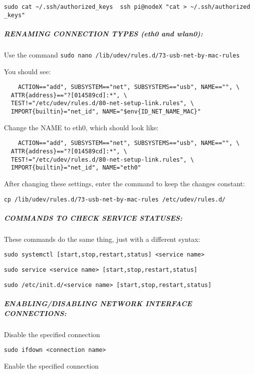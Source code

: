 \documentclass[]{article}
\let\oldsubparagraph\subparagraph
\renewcommand{\subparagraph}[1]{\oldsubparagraph{#1}\mbox{}}
\begin{document}
\texttt{sudo\ cat\ \textasciitilde{}/.ssh/authorized\_keys\ \textbar{}\ ssh\ pi@nodeX\ "cat\ \textgreater{}\ \textasciitilde{}/.ssh/authorized\_keys"}

\subparagraph{RENAMING CONNECTION TYPES (eth0 and
wlan0):}\label{renaming-connection-types-eth0-and-wlan0}

Use the command
\texttt{sudo\ nano\ /lib/udev/rules.d/73-usb-net-by-mac-rules}

You should see:

\begin{verbatim}
    ACTION=="add", SUBSYSTEM=="net", SUBSYSTEMS=="usb", NAME=="", \
  ATTR{address}=="?[014589cd]:*", \
  TEST!="/etc/udev/rules.d/80-net-setup-link.rules", \
  IMPORT{builtin}="net_id", NAME="$env{ID_NET_NAME_MAC}"
\end{verbatim}

Change the NAME to eth0, which should look like:

\begin{verbatim}
    ACTION=="add", SUBSYSTEM=="net", SUBSYSTEMS=="usb", NAME=="", \
  ATTR{address}=="?[014589cd]:*", \
  TEST!="/etc/udev/rules.d/80-net-setup-link.rules", \
  IMPORT{builtin}="net_id", NAME="eth0"
\end{verbatim}

After changing these settings, enter the command to keep the changes
constant:

\texttt{cp\ /lib/udev/rules.d/73-usb-net-by-mac-rules\ /etc/udev/rules.d/}

\subparagraph{COMMANDS TO CHECK SERVICE
STATUSES:}\label{commands-to-check-service-statuses}

These commands do the same thing, just with a different syntax:

\texttt{sudo\ systemctl\ {[}start,stop,restart,status{]}\ \textless{}service\ name\textgreater{}}

\texttt{sudo\ service\ \textless{}service\ name\textgreater{}\ {[}start,stop,restart,status{]}}

\texttt{sudo\ /etc/init.d/\textless{}service\ name\textgreater{}\ {[}start,stop,restart,status{]}}

\subparagraph{ENABLING/DISABLING NETWORK INTERFACE
CONNECTIONS:}\label{enablingdisabling-network-interface-connections}

Disable the specified connection

\texttt{sudo\ ifdown\ \textless{}connection\ name\textgreater{}}

Enable the specified connection
\end{document}
